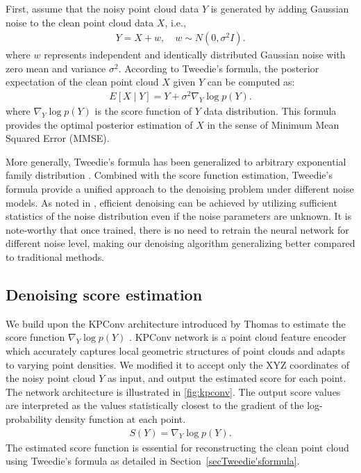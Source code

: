First, assume that the noisy point cloud data $Y$ is generated by adding Gaussian noise to the clean point cloud data $X$, i.e.,
\begin{eqnarray}
Y = X + w, \quad w \sim N(0, \sigma^2I).
\end{eqnarray}
where $w$ represents independent and identically distributed Gaussian noise with zero mean and variance $\sigma^2$. According to Tweedie’s formula, the posterior expectation of the clean point cloud $X$ given $Y$ can be computed as:
\begin{eqnarray}
E[X \mid Y] = Y + \sigma^2 \nabla_Y \log p(Y).
\end{eqnarray}
where $\nabla_Y \log p(Y)$ is the score function of $Y$ data distribution. This formula provides the optimal posterior estimation of $X$ in the sense of Minimum Mean Squared Error (MMSE)\cite{Serfling1980ApproximationTO}.

More generally, Tweedie’s formula has been generalized to arbitrary exponential family distribution \cite{efron2011tweedie}.  Combined with the score function estimation, Tweedie’s formula provide a unified approach to the denoising problem under different noise models. As noted in \cite{noise2score2021}, efficient denoising can be achieved by utilizing sufficient statistics of the noise distribution even if the noise parameters are unknown. It is note-worthy that once trained, there is no need to retrain the neural network for different noise level, making our denoising algorithm generalizing better compared to traditional methods.

    \subsection{Denoising score estimation}
We build upon the KPConv architecture introduced by Thomas \etal \cite{KPconv} to estimate the score function $\nabla_Y \log p(Y)$ . 
KPConv network is a point cloud feature encoder which accurately captures local geometric structures of point clouds and adapts to varying point densities. We modified it to accept only the XYZ coordinates of the noisy point cloud $Y$ as input, and output the estimated score for each point. The network architecture is illustrated in \cref{fig:kpconv}. 
The output score values are interpreted as the values statistically closest to the gradient of the log-probability density function at each point.
\begin{eqnarray}
S(Y) = \nabla_Y \log p(Y).
\end{eqnarray}
The estimated score function is essential for reconstructing the clean point cloud using Tweedie's formula as detailed in Section~\ref{secTweedie'sformula}.

